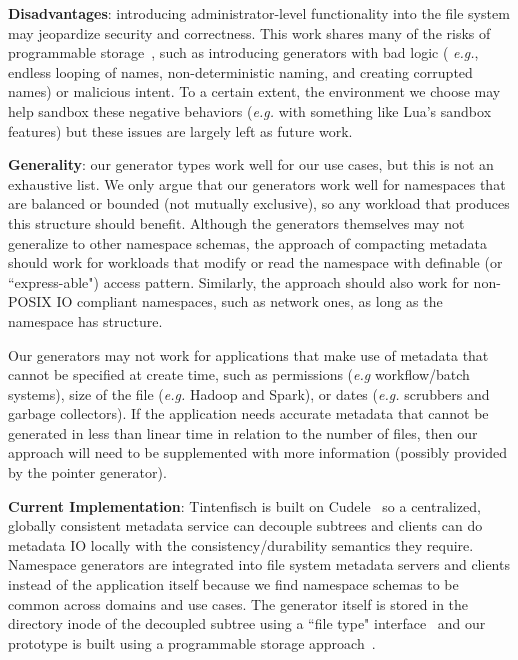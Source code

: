 \textbf{Disadvantages}: introducing administrator-level functionality into the
file system may jeopardize security and correctness. This work shares many of
the risks of programmable storage~\cite{sevilla:eurosys17-malacology,
sevilla:sc15-mantle}, such as introducing generators with bad logic ({\it
e.g.}, endless looping of names, non-deterministic naming, and creating
corrupted names) or malicious intent. To a certain extent, the environment we
choose may help sandbox these negative behaviors ({\it e.g.} with something
like Lua's sandbox features) but these issues are largely left as future work.

\textbf{Generality}: our generator types work well for our use cases, but this
is not an exhaustive list. We only argue that our generators work well for
namespaces that are balanced or bounded (not mutually exclusive), so any
workload that produces this structure should benefit. Although the generators
themselves may not generalize to other namespace schemas, the approach of
compacting metadata should work for workloads that modify or read the namespace
with definable (or ``express-able") access pattern.  Similarly, the approach
should also work for non-POSIX IO compliant namespaces, such as network ones,
as long as the namespace has structure.

Our generators may not work for applications that make use of metadata that
cannot be specified at create time, such as permissions ({\it e.g}
workflow/batch systems), size of the file ({\it e.g.} Hadoop and Spark), or
dates ({\it e.g.} scrubbers and garbage collectors). If the application needs
accurate metadata that cannot be generated in less than linear time in relation
to the number of files, then our approach will need to be supplemented with
more information (possibly provided by the pointer generator).

\textbf{Current Implementation}: Tintenfisch is built on
Cudele~\cite{sevilla:ipdps18-cudele} so a centralized, globally consistent
metadata service can decouple subtrees and clients can do metadata IO locally
with the consistency/durability semantics they require.  Namespace generators
are integrated into file system metadata servers and clients instead of the
application itself because we find namespace schemas to be common across
domains and use cases. The generator itself is stored in the directory inode of
the decoupled subtree using a ``file type"
interface~\cite{watkins_datamods_2012} and our prototype is built using a
programmable storage approach~\cite{sevilla:eurosys17-malacology,
oldfield:cc06-lwfs}.



